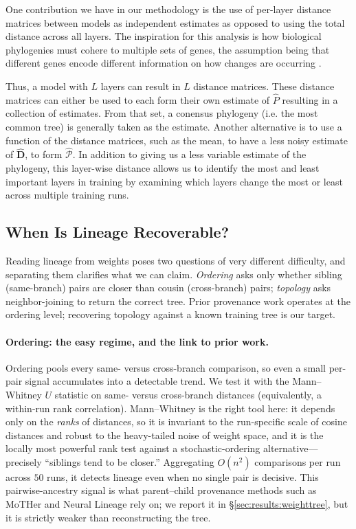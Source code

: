 \documentclass{article}
\theoremstyle{definition}
\theoremstyle{plain}
\begin{document}
One contribution we have in our methodology is the use of per-layer distance matrices between models as independent estimates as opposed to using the total distance across all layers.  The inspiration for this analysis is how biological phylogenies must cohere to multiple sets of genes, the assumption being that different genes encode different information on how changes are occurring \cite{maddison1997gene}.

Thus, a model with $L$ layers can result in $L$ distance matrices.  These distance matrices can either be used to each form their own estimate of $\hat{P}$ resulting in a collection of estimates.  From that set, a conensus phylogeny (i.e. the most common tree) is generally taken as the estimate.  Another alternative is to use a function of the distance matrices, such as the mean, to have a less noisy estimate of $\hat{\textbf{D}}$, to form $\widehat{\mathcal{P}}$. In addition to giving us a less variable estimate of the phylogeny, this layer-wise distance allows us to identify the most and least important layers in training by examining which layers change the most or least across multiple training runs.


\subsection{When Is Lineage Recoverable?}
\label{sec:framework:theory}

Reading lineage from weights poses two questions of very different difficulty, and separating them
clarifies what we can claim. \emph{Ordering} asks only whether sibling (same-branch) pairs are closer
than cousin (cross-branch) pairs; \emph{topology} asks neighbor-joining to return the correct tree.
Prior provenance work operates at the ordering level; recovering topology against a known training tree
is our target.

\paragraph{Ordering: the easy regime, and the link to prior work.}
Ordering pools every same- versus cross-branch comparison, so even a small per-pair signal accumulates
into a detectable trend. We test it with the Mann--Whitney $U$ statistic on same- versus cross-branch
distances (equivalently, a within-run rank correlation). Mann--Whitney is the right tool here: it
depends only on the \emph{ranks} of distances, so it is invariant to the run-specific scale of cosine
distances and robust to the heavy-tailed noise of weight space, and it is the locally most powerful rank
test against a stochastic-ordering alternative---precisely ``siblings tend to be closer.'' Aggregating
$O(n^2)$ comparisons per run across $50$ runs, it detects lineage even when no single pair is decisive.
This pairwise-ancestry signal is what parent--child provenance methods such as MoTHer
\citep{horwitz2024mother} and Neural Lineage \citep{yu2024neurallineage} rely on; we report it in
\S\ref{sec:results:weighttree}, but it is strictly weaker than reconstructing the tree.
\end{document}
